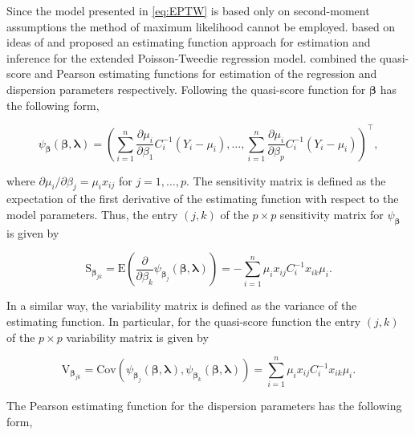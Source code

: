 \documentclass[9pt,a5paper,]{book}
\theoremstyle{definition}
\theoremstyle{definition}
\theoremstyle{remark}
\begin{document}
Since the model presented in \eqref{eq:EPTW} is based only on
second-moment assumptions the method of maximum likelihood cannot be
employed. \citet{Bonat2016b} based on ideas of \citet{Jorgensen2004} and
\citet{Bonat2016a} proposed an estimating function approach for
estimation and inference for the extended Poisson-Tweedie regression
model. \citet{Bonat2016b} combined the quasi-score and Pearson
estimating functions for estimation of the regression and dispersion
parameters respectively. Following \citet{Bonat2016b} the quasi-score
function for \(\boldsymbol{\beta}\) has the following form,

\begin{equation*}
\psi_{\boldsymbol{\beta}}(\boldsymbol{\beta}, \boldsymbol{\lambda}) = \left (\sum_{i=1}^n \frac{\partial \mu_i}{\partial \beta_1}C^{-1}_i(Y_i - \mu_i), \ldots, \sum_{i=1}^n \frac{\partial \mu_i}{\partial \beta_p}C^{-1}_i(Y_i - \mu_i)  \right )^\top,
\end{equation*}

where \(\partial \mu_i/\partial \beta_j = \mu_i x_{ij}\) for
\(j = 1, \ldots, p\). The sensitivity matrix is defined as the
expectation of the first derivative of the estimating function with
respect to the model parameters. Thus, the entry \((j,k)\) of the
\(p \times p\) sensitivity matrix for \(\psi_{\boldsymbol{\beta}}\) is
given by

\begin{equation}
\mathrm{S}_{\boldsymbol{\beta}_{jk}} = \mathrm{E}\left ( \frac{\partial}{\partial \beta_k} \psi_{\boldsymbol{\beta}_j}(\boldsymbol{\beta}, \boldsymbol{\lambda})  \right ) = -\sum_{i=1}^n \mu_i x_{ij} C^{-1}_i x_{ik} \mu_i.
\label{eq:Sbeta}
\end{equation}

In a similar way, the variability matrix is defined as the variance of
the estimating function. In particular, for the quasi-score function the
entry \((j,k)\) of the \(p \times p\) variability matrix is given by

\begin{equation*}
\label{Vbeta}
\mathrm{V}_{\boldsymbol{\beta}_{jk}} = \mathrm{Cov}(\psi_{\boldsymbol{\beta}_j}(\boldsymbol{\beta}, \boldsymbol{\lambda}),\psi_{\boldsymbol{\beta}_k}(\boldsymbol{\beta}, \boldsymbol{\lambda})) = \sum_{i=1}^n \mu_i x_{ij} C^{-1}_i x_{ik} \mu_i.
\end{equation*}

The Pearson estimating function for the dispersion parameters has the
following form,
\end{document}
